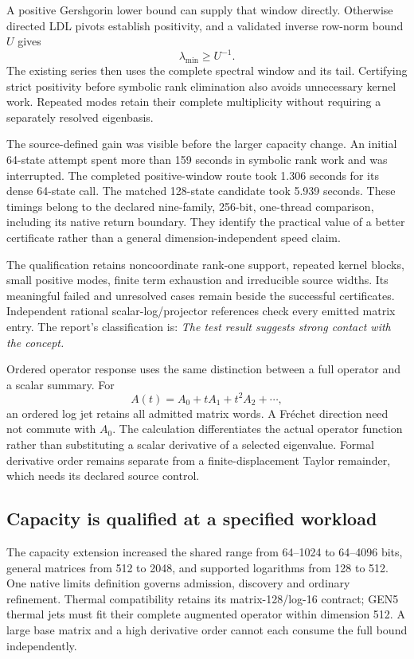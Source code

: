 A positive Gershgorin lower bound can supply that window directly. Otherwise directed LDL pivots establish positivity, and a validated inverse row-norm bound $U$ gives
\[
 \lambda_{\min}\geq U^{-1}.
\]
The existing series then uses the complete spectral window and its tail. Certifying strict positivity before symbolic rank elimination also avoids unnecessary kernel work. Repeated modes retain their complete multiplicity without requiring a separately resolved eigenbasis.

The source-defined gain was visible before the larger capacity change. An initial 64-state attempt spent more than 159 seconds in symbolic rank work and was interrupted. The completed positive-window route took 1.306 seconds for its dense 64-state call. The matched 128-state candidate took 5.939 seconds. These timings belong to the declared nine-family, 256-bit, one-thread comparison, including its native return boundary. They identify the practical value of a better certificate rather than a general dimension-independent speed claim.

The qualification retains noncoordinate rank-one support, repeated kernel blocks, small positive modes, finite term exhaustion and irreducible source widths. Its meaningful failed and unresolved cases remain beside the successful certificates. Independent rational scalar-log/projector references check every emitted matrix entry. The report's classification is: \emph{The test result suggests strong contact with the concept.}

Ordered operator response uses the same distinction between a full operator and a scalar summary. For
\[
 A(t)=A_0+tA_1+t^2A_2+\cdots,
\]
an ordered log jet retains all admitted matrix words. A Fr\'echet direction need not commute with $A_0$. The calculation differentiates the actual operator function rather than substituting a scalar derivative of a selected eigenvalue. Formal derivative order remains separate from a finite-displacement Taylor remainder, which needs its declared source control.

\subsection{Capacity is qualified at a specified workload}
\label{v3-runtime-capacity}

The capacity extension increased the shared range from 64--1024 to 64--4096 bits, general matrices from 512 to 2048, and supported logarithms from 128 to 512. One native limits definition governs admission, discovery and ordinary refinement. Thermal compatibility retains its matrix-128/log-16 contract; GEN5 thermal jets must fit their complete augmented operator within dimension 512. A large base matrix and a high derivative order cannot each consume the full bound independently.

